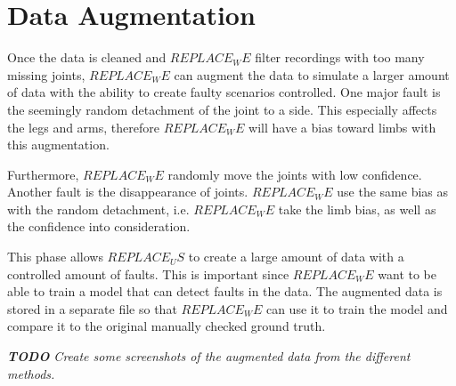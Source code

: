 \section{Data Augmentation}
\label{sec:data_augmentation}

Once the data is cleaned and $REPLACE_WE$ filter recordings with too many missing joints, $REPLACE_WE$ can augment the data to simulate a larger amount of data with the ability to create faulty scenarios controlled. One major fault is the seemingly random detachment of the joint to a side. This especially affects the legs and arms, therefore $REPLACE_WE$ will have a bias toward limbs with this augmentation. 

Furthermore, $REPLACE_WE$ randomly move the joints with low confidence. Another fault is the disappearance of joints. $REPLACE_WE$ use the same bias as with the random detachment, i.e. $REPLACE_WE$ take the limb bias, as well as the confidence into consideration.

This phase allows $REPLACE_US$ to create a large amount of data with a controlled amount of faults. This is important since $REPLACE_WE$ want to be able to train a model that can detect faults in the data. The augmented data is stored in a separate file so that $REPLACE_WE$ can use it to train the model and compare it to the original manually checked ground truth.

\textit{\textbf{TODO} Create some screenshots of the augmented data from the different methods.}